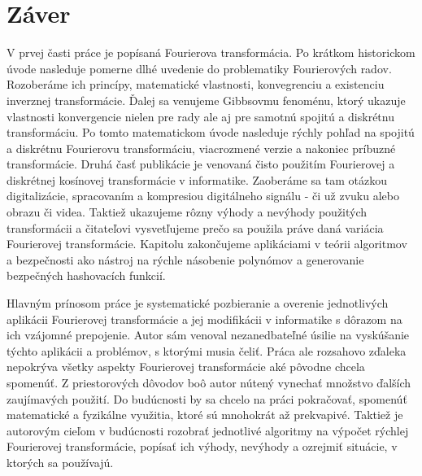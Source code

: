 \chapter{Záver}

V prvej časti práce je popísaná Fourierova transformácia. Po krátkom
historickom úvode nasleduje pomerne dlhé uvedenie do problematiky
Fourierových radov. Rozoberáme ich princípy, matematické vlastnosti,
konvegrenciu a existenciu inverznej transformácie. Ďalej sa venujeme
Gibbsovmu fenoménu, ktorý ukazuje vlastnosti konvergencie nielen pre
rady ale aj pre samotnú spojitú a diskrétnu transformáciu. Po tomto
matematickom úvode nasleduje rýchly pohľad na spojitú a diskrétnu
Fourierovu transformáciu, viacrozmené verzie a nakoniec príbuzné
transformácie.
Druhá časť publikácie je venovaná čisto použitím Fourierovej a
diskrétnej kosínovej transformácie v informatike. Zaoberáme sa tam
otázkou digitalizácie, spracovaním a kompresiou digitálneho signálu -
či už zvuku alebo obrazu či videa. Taktiež ukazujeme rôzny výhody a
nevýhody použitých transformácii a čitateľovi vysvetľujeme prečo sa
použila práve daná variácia Fourierovej transformácie. Kapitolu
zakončujeme aplikáciami v teórii algoritmov a bezpečnosti ako nástroj
na rýchle násobenie polynómov a generovanie bezpečných hashovacích
funkcií.

Hlavným prínosom práce je systematické pozbieranie a overenie jednotlivých
aplikácii Fourierovej transformácie a jej modifikácii v informatike s
dôrazom na ich vzájomné prepojenie. Autor sám venoval nezanedbateľné
úsilie na vyskúšanie týchto aplikácii a problémov, s ktorými musia
čeliť. Práca ale rozsahovo zďaleka
nepokrýva všetky aspekty Fourierovej transformácie aké pôvodne chcela
spomenúť. Z priestorových dôvodov boô autor nútený
vynechať množstvo ďalších zaujímavých použití. Do budúcnosti by sa
chcelo na práci pokračovať, spomenúť matematické a fyzikálne využitia,
ktoré sú mnohokrát až prekvapivé. Taktiež je autorovým cieľom v
budúcnosti rozobrať jednotlivé algoritmy na výpočet rýchlej Fourierovej transformácie,
popísať ich výhody, nevýhody a ozrejmiť situácie, v ktorých sa
používajú.
